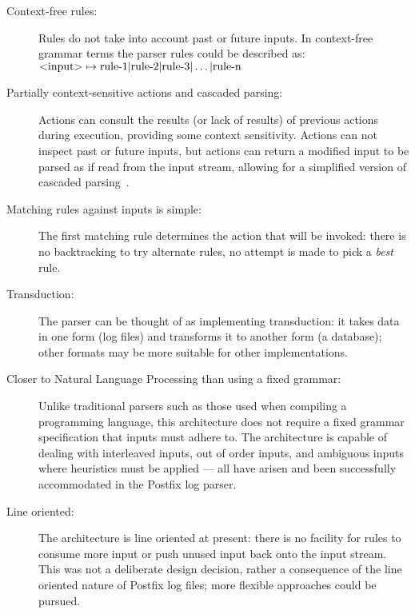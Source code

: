 \documentclass{svmult}
\begin{document}
\begin{description}

    \item [Context-free rules:]  Rules do not take into account past or
        future inputs.  In context-free grammar terms the parser rules
        could be described as:
        \newline{}$\text{\textless{}input\textgreater{}} \mapsto
        \text{rule-1} | \text{rule-2} | \text{rule-3} | \dots |
        \text{rule-n}$

    \item [Partially context-sensitive actions and cascaded parsing:]
        Actions can consult the results (or lack of results) of previous
        actions during execution, providing some context sensitivity.
        Actions can not inspect past or future inputs, but actions can
        return a modified input to be parsed as if read from the input
        stream, allowing for a simplified version of cascaded
        parsing~\cite{cascaded-parsing}.

    \item [Matching rules against inputs is simple:]  The first matching
        rule determines the action that will be invoked: there is no
        backtracking to try alternate rules, no attempt is made to pick a
        \textit{best\/} rule.

    \item [Transduction:]  The parser can be thought of as implementing
        transduction: it takes data in one form (log files) and transforms
        it to another form (a database); other formats may be more suitable
        for other implementations.

    \item [Closer to Natural Language Processing than using a fixed
        grammar:] Unlike traditional parsers such as those used when
        compiling a programming language, this architecture does not
        require a fixed grammar specification that inputs must adhere to.
        The architecture is capable of dealing with interleaved inputs, out
        of order inputs, and ambiguous inputs where heuristics must be
        applied --- all have arisen and been successfully accommodated in
        the Postfix log parser.

    \item [Line oriented:]  The architecture is line oriented at present:
        there is no facility for rules to consume more input or push unused
        input back onto the input stream.  This was not a deliberate design
        decision, rather a consequence of the line oriented nature of
        Postfix log files; more flexible approaches could be pursued.

\end{description}
\end{document}
